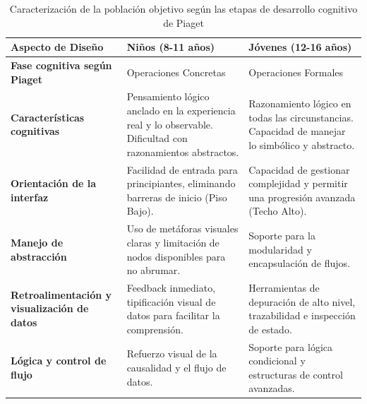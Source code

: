 \begin{table}[H]
  \centering
  \caption{Caracterización de la población objetivo según las etapas de desarrollo cognitivo de Piaget}
  \label{tab:analisis-poblacion}
  \begingroup
  \renewcommand{\arraystretch}{\TableRowStretch}
  \renewcommand{\TableBodyFontSize}{\footnotesize}
  \begin{tabularx}{\textwidth}{ X X X }
    \hline
    \textbf{Aspecto de Diseño}                          & \textbf{Niños (8-11 años)}                                                                                  & \textbf{Jóvenes (12-16 años)}                                                                   \\
    \hline
    \textbf{Fase cognitiva según Piaget}                & Operaciones Concretas                                                                                       & Operaciones Formales                                                                            \\
    \textbf{Características cognitivas}                 & Pensamiento lógico anclado en la experiencia real y lo observable. Dificultad con razonamientos abstractos. & Razonamiento lógico en todas las circunstancias. Capacidad de manejar lo simbólico y abstracto. \\
    \textbf{Orientación de la interfaz}                 & Facilidad de entrada para principiantes, eliminando barreras de inicio (Piso Bajo).                         & Capacidad de gestionar complejidad y permitir una progresión avanzada (Techo Alto).             \\
    \textbf{Manejo de abstracción}                      & Uso de metáforas visuales claras y limitación de nodos disponibles para no abrumar.                         & Soporte para la modularidad y encapsulación de flujos.                                          \\
    \textbf{Retroalimentación y visualización de datos} & Feedback inmediato, tipificación visual de datos para facilitar la comprensión.                             & Herramientas de depuración de alto nivel, trazabilidad e inspección de estado.                  \\
    \textbf{Lógica y control de flujo}                  & Refuerzo visual de la causalidad y el flujo de datos.                                                       & Soporte para lógica condicional y estructuras de control avanzadas.                             \\
    \hline
  \end{tabularx}
  \endgroup
\end{table}

